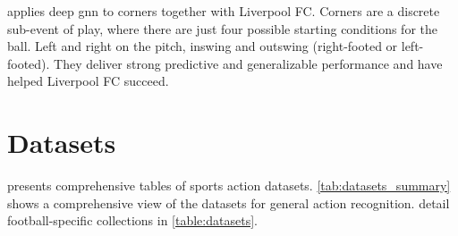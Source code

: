 \textcite{wang_tactic_ai_2024} applies deep \acrfull{gnn} to corners together with Liverpool FC. Corners are a discrete sub-event of play, where there are just four possible starting conditions for the ball. Left and right on the pitch, inswing and outswing (right-footed or left-footed). They deliver strong predictive and generalizable performance and have helped Liverpool FC succeed. 

\section{Datasets}
\label{sec:datasets}

\textcite{survey_of_survey} presents comprehensive tables of sports action datasets. \cref{tab:datasets_summary} shows a comprehensive view of the datasets for general action recognition. \textcite{seweryn_survey_2023} detail football-specific collections in \cref{table:datasets}.

